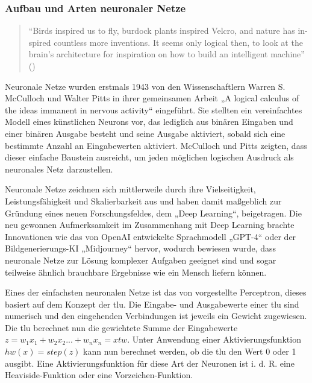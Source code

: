 \subsubsection{Aufbau und Arten neuronaler Netze}

\begin{quote}
  "`Birds inspired us to fly, burdock plants inspired Velcro, and nature has in- spired countless more inventions. It seems only logical then, to look at the brain’s architecture for inspiration on how to build an intelligent machine"' (\cite[S. 279]{Geron2019})
\end{quote}

Neuronale Netze wurden erstmals 1943 von den Wissenschaftlern Warren S. McCulloch und Walter Pitts in ihrer gemeinsamen Arbeit „A logical calculus of the ideas immanent in nervous activity“ \cite{McCulloch1943} eingeführt. Sie stellten ein vereinfachtes Modell eines künstlichen Neurons vor, das lediglich aus binären Eingaben und einer binären Ausgabe besteht und seine Ausgabe aktiviert, sobald sich eine bestimmte Anzahl an Eingabewerten aktiviert. McCulloch und Pitts zeigten, dass dieser einfache Baustein ausreicht, um jeden möglichen logischen Ausdruck als neuronales Netz darzustellen.

Neuronale Netze zeichnen sich mittlerweile durch ihre Vielseitigkeit, Leistungsfähigkeit und Skalierbarkeit aus und haben damit maßgeblich zur Gründung eines neuen Forschungsfeldes, dem „Deep Learning“, beigetragen. \cite{Geron2019} Die neu gewonnen Aufmerksamkeit im Zusammenhang mit Deep Learning brachte Innovationen wie das von OpenAI entwickelte Sprachmodell „GPT-4“ oder der Bildgenerierungs-KI „Midjourney“ hervor, wodurch bewiesen wurde, dass neuronale Netze zur Lösung komplexer Aufgaben geeignet sind und sogar teilweise ähnlich brauchbare Ergebnisse wie ein Mensch liefern können. \cite{OpenAI2024}

Eines der einfachsten neuronalen Netze ist das von \cite{Rosenblatt1958} vorgestellte Perceptron, dieses basiert auf dem Konzept der \ac{tlu}. Die Eingabe- und Ausgabewerte einer \ac{tlu} sind numerisch und den eingehenden Verbindungen ist jeweils ein Gewicht zugewiesen. Die \ac{tlu} berechnet nun die gewichtete Summe der Eingabewerte \(z=w_1x_1+w_2x_2 ... +w_nx_n=xtw\). Unter Anwendung einer Aktivierungsfunktion \(hw(x)=step(z)\) kann nun berechnet werden, ob die \ac{tlu} den Wert 0 oder 1 ausgibt. Eine Aktivierungsfunktion für diese Art der Neuronen ist i. d. R. eine Heaviside-Funktion oder eine Vorzeichen-Funktion. \cite[vgl. S. 284 ff.]{Geron2019}

